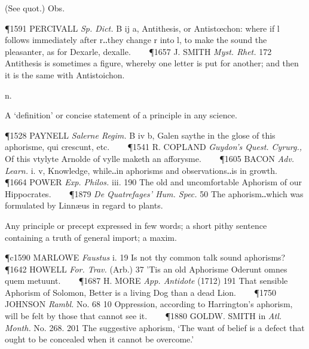 \begin{description}[wide, labelwidth=!, labelindent=0pt]
\begin{myenumerate}
 (See quot.) Obs.

\P 1591 PERCIVALL  \textit{Sp. Dict.} B ij a, Antithesis, or Antistœchon: where if l follows immediately after r‥they change r into l, to make the sound the pleasanter, as for Dexarle, dexalle.    
\P 1657 J. SMITH  \textit{Myst. Rhet.} 172 Antithesis is sometimes a figure, whereby one letter is put for another; and then it is the same with Antistoichon.
\end{myenumerate}


 n.

\noindent {}

\vspace{-0.3cm}

\begin{myenumerate}

 A ‘definition’ or concise statement of a principle in any science.

\P 1528 PAYNELL  \textit{Salerne Regim.} B iv b, Galen saythe in the glose of this aphorisme, qui crescunt, etc.    
\P 1541 R. COPLAND  \textit{Guydon's Quest. Cyrurg.,} Of this vtylyte Arnolde of vylle maketh an afforysme.    
\P 1605 BACON  \textit{Adv. Learn.} i. v, Knowledge, while‥in aphorisms and observations‥is in growth.    
\P 1664 POWER  \textit{Exp. Philos.} iii. 190 The old and uncomfortable Aphorism of our Hippocrates.    
\P 1879 \textit{De Quatrefages' Hum. Spec.} 50 The aphorism‥which was formulated by Linnæus in regard to plants.

 Any principle or precept expressed in few words; a short pithy sentence containing a truth of general import; a maxim.

\P c1590 MARLOWE  \textit{Faustus} i. 19 Is not thy common talk sound aphorisms?    
\P 1642 HOWELL  \textit{For. Trav.} (Arb.) 37 'Tis an old Aphorisme Oderunt omnes quem metuunt.    
\P 1687 H. MORE  \textit{App. Antidote} (1712) 191 That sensible Aphorism of Solomon, Better is a living Dog than a dead Lion.    
\P 1750 JOHNSON  \textit{Rambl.} No. 68 10 Oppression, according to Harrington's aphorism, will be felt by those that cannot see it.    
\P 1880 GOLDW.  SMITH in \textit{Atl. Month.} No. 268. 201 The suggestive aphorism, ‘The want of belief is a defect that ought to be concealed when it cannot be overcome.’


\end{myenumerate}
\end{description}
